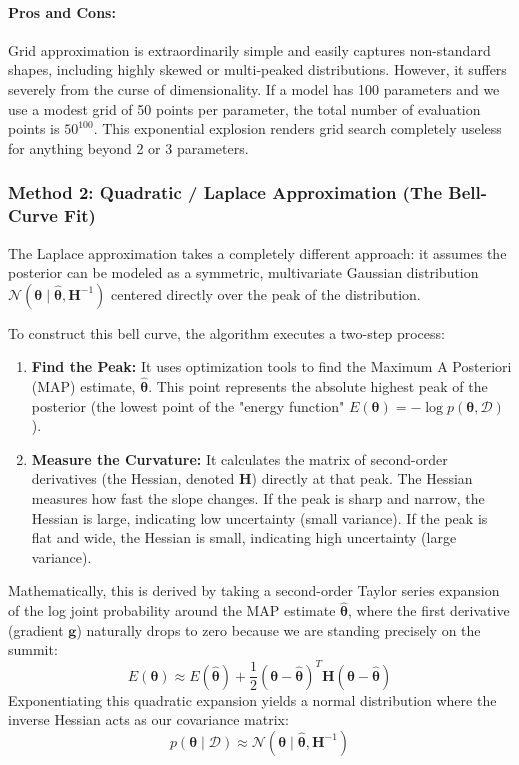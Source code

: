 \documentclass{article}
\begin{document}
\paragraph{Pros and Cons:} 
Grid approximation is extraordinarily simple and easily captures non-standard shapes, including highly skewed or multi-peaked distributions. However, it suffers severely from the curse of dimensionality. If a model has 100 parameters and we use a modest grid of 50 points per parameter, the total number of evaluation points is $50^{100}$. This exponential explosion renders grid search completely useless for anything beyond 2 or 3 parameters.

\subsubsection{Method 2: Quadratic / Laplace Approximation (The Bell-Curve Fit)}
The Laplace approximation takes a completely different approach: it assumes the posterior can be modeled as a symmetric, multivariate Gaussian distribution $\mathcal{N}(\boldsymbol{\theta} \mid \hat{\boldsymbol{\theta}}, \mathbf{H}^{-1})$ centered directly over the peak of the distribution.

To construct this bell curve, the algorithm executes a two-step process:
\begin{enumerate}
    \item \textbf{Find the Peak:} It uses optimization tools to find the Maximum A Posteriori (MAP) estimate, $\hat{\boldsymbol{\theta}}$. This point represents the absolute highest peak of the posterior (the lowest point of the "energy function" $E(\boldsymbol{\theta}) = -\log p(\boldsymbol{\theta}, \mathcal{D})$).
    \item \textbf{Measure the Curvature:} It calculates the matrix of second-order derivatives (the Hessian, denoted $\mathbf{H}$) directly at that peak. The Hessian measures how fast the slope changes. If the peak is sharp and narrow, the Hessian is large, indicating low uncertainty (small variance). If the peak is flat and wide, the Hessian is small, indicating high uncertainty (large variance).
\end{enumerate}

Mathematically, this is derived by taking a second-order Taylor series expansion of the log joint probability around the MAP estimate $\hat{\boldsymbol{\theta}}$, where the first derivative (gradient $\mathbf{g}$) naturally drops to zero because we are standing precisely on the summit:
\begin{equation}
E(\boldsymbol{\theta}) \approx E(\hat{\boldsymbol{\theta}}) + \frac{1}{2}(\boldsymbol{\theta} - \hat{\boldsymbol{\theta}})^T \mathbf{H} (\boldsymbol{\theta} - \hat{\boldsymbol{\theta}})
\end{equation}
Exponentiating this quadratic expansion yields a normal distribution where the inverse Hessian acts as our covariance matrix:
\begin{equation}
p(\boldsymbol{\theta} \mid \mathcal{D}) \approx \mathcal{N}(\boldsymbol{\theta} \mid \hat{\boldsymbol{\theta}}, \mathbf{H}^{-1})
\end{equation}
\end{document}
